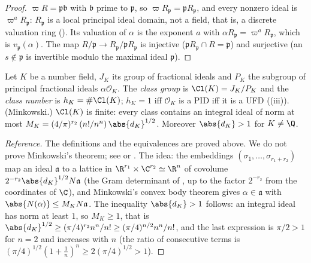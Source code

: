 \begin{proof}
$\varpi R=\mathfrak p\mathfrak b$ with $\mathfrak b$ prime to $\mathfrak p$, so $\varpi R_{\mathfrak p}=\mathfrak pR_{\mathfrak p}$, and every nonzero ideal is
$\varpi^aR_{\mathfrak p}$: $R_{\mathfrak p}$ is a local principal ideal domain, not a field, that is, a discrete valuation ring (). Its
valuation of $\alpha$ is the exponent $a$ with $\alpha R_{\mathfrak p}=\varpi^aR_{\mathfrak p}$, which is $v_{\mathfrak p}(\alpha)$. The map $R/\mathfrak p\to
R_{\mathfrak p}/\mathfrak pR_{\mathfrak p}$ is injective ($\mathfrak pR_{\mathfrak p}\cap R=\mathfrak p$) and surjective (an $s\notin\mathfrak p$ is invertible
modulo the maximal ideal $\mathfrak p$).
\end{proof}

\begin{theorem}\label{thm:ant:classgroup}
Let $K$ be a number field, $J_K$ its group of fractional ideals and $P_K$ the subgroup of principal fractional ideals $\alpha\mathcal O_K$. The
\emph{class group} is $\Cl(K)=J_K/P_K$ and the \emph{class number} is $h_K=\#\Cl(K)$; $h_K=1$ iff $\mathcal O_K$ is a PID iff it is a UFD
((iii)). (Minkowski.) $\Cl(K)$ is finite: every class contains an integral ideal of norm at most
$M_K=(4/\pi)^{r_2}\,(n!/n^n)\,\abs{d_K}^{1/2}$. Moreover $\abs{d_K}>1$ for $K\ne\Q$.
\end{theorem}

\begin{proof}[Reference]
The definitions and the equivalences are proved above. We do not prove Minkowski's theorem; see \cite[Chapter I, Sections 5 and 6]{Neukirch} or
\cite[Chapter 5]{Marcus77}. The idea: the embeddings $(\sigma_1,\dots,\sigma_{r_1+r_2})$ map an ideal $\mathfrak a$ to a lattice in
$\R^{r_1}\times\C^{r_2}\simeq\R^n$ of covolume $2^{-r_2}\abs{d_K}^{1/2}N\mathfrak a$ (the Gram determinant of , up to the
factor $2^{-r_2}$ from the coordinates of $\C$), and Minkowski's convex body theorem gives $\alpha\in\mathfrak a$ with $\abs{N(\alpha)}\le
M_KN\mathfrak a$. The inequality $\abs{d_K}>1$ follows: an integral ideal has norm at least $1$, so $M_K\ge1$, that is
$\abs{d_K}^{1/2}\ge(\pi/4)^{r_2}n^n/n!\ge(\pi/4)^{n/2}n^n/n!$, and the last expression is $\pi/2>1$ for $n=2$ and increases with $n$ (the ratio of consecutive
terms is $(\pi/4)^{1/2}(1+\frac1n)^n\ge2(\pi/4)^{1/2}>1$).
\end{proof}

